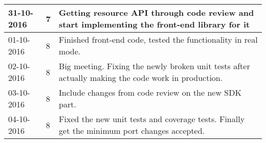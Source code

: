 \begin{tabular}{|p{2cm}|p{1cm}|p{10cm}|}
	\\ \hline
	
	31-10-2016 & 7 & Getting resource API through code review and start implementing the front-end library for it \\ \hline
	01-10-2016 & 8 & Finished front-end code, tested the functionality in real mode. \\ \hline
	02-10-2016 & 8 & Big meeting. Fixing the newly broken unit tests after actually making the code work in production. \\ \hline
	03-10-2016 & 8 & Include changes from code review on the new SDK part. \\ \hline
	04-10-2016 & 8 & Fixed the new unit tests and coverage tests. Finally get the minimum port changes accepted. \\ \hline
\end{tabular}